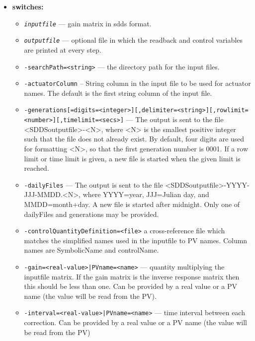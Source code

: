 \begin{itemize}
%
\item {\bf switches:}
%
%
    \begin{itemize}
%
        \item {\tt {\em inputfile}} --- gain matrix in sdds format.
        \item {\tt {\em outputfile}} --- optional file in which the readback and
               control variables are printed at every step.
        \item {\tt -searchPath=<string>} --- the directory path for the input files.
        \item {\tt -actuatorColumn} -- String column in the input file to be used for
               actuator names. The default is the first string column
               of the input file.
        \item {\tt -generations[=digits=<integer>][,delimiter=<string>][,rowlimit=<number>][,timelimit=<secs>]} --- The output is sent to the file <SDDSoutputfile>-<N>, where <N> is
               the smallest positive integer such that the file does not already 
               exist. By default, four digits are used for formatting <N>, so that
               the first generation number is 0001.  If a row limit or time limit
               is given, a new file is started when the given limit is reached.
        \item {\tt -dailyFiles} --- The output is sent to the file <SDDSoutputfile>-YYYY-JJJ-MMDD.<N>,
               where YYYY=year, JJJ=Julian day, and MMDD=month+day.  A new file is
               started after midnight. Only one of dailyFiles and generations may be provided.
        \item {\tt -controlQuantityDefinition=<file>}
               a cross-reference file which matches the simplified
               names used in the inputfile to PV names.
               Column names are SymbolicName and controlName.
        \item {\tt -gain=<real-value>|PVname=<name>} --- quantity multiplying the inputfile matrix.
               If the gain matrix is the inverse response matrix
               then this should be less than one. Can be provided by a real value or a PV name (the value will be read from the PV).
        \item {\tt -interval=<real-value>|PVname=<name>} --- time interval between each correction. Can be provided by a real value or a PV name (the value will be read from the PV)

\end{itemize}
\end{itemize}
